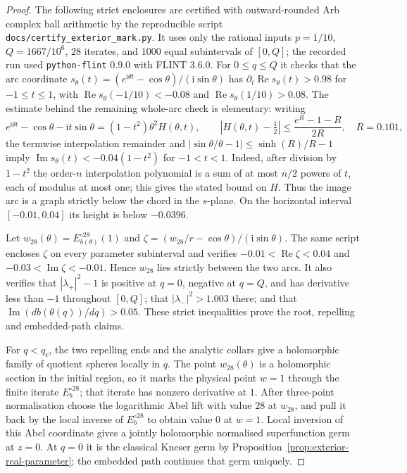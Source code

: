 \documentclass[11pt,a4paper]{article}
\theoremstyle{definition}
\newcommand{\ii}{\mathrm{i}}
\begin{document}
\begin{proof}
The following strict enclosures are certified with outward-rounded
Arb complex ball arithmetic by the reproducible script
\texttt{docs/certify\_exterior\_mark.py}.  It uses only the rational
inputs $p=1/10$, $Q=1667/10^6$, $28$ iterates, and $1000$ equal
subintervals of $[0,Q]$; the recorded run used
\texttt{python-flint} 0.9.0 with FLINT 3.6.0.  For $0\le q\le Q$ it checks that the arc
coordinate
$s_\theta(t)=(e^{\ii\theta t}-\cos\theta)/(\ii\sin\theta)$
has $\partial_t\operatorname{Re}s_\theta(t)>0.98$ for $-1\le t\le1$,
with $\operatorname{Re}s_\theta(-1/10)<-0.08$ and
$\operatorname{Re}s_\theta(1/10)>0.08$.
The estimate behind the remaining whole-arc check is elementary:
writing
\[
 e^{\ii\theta t}-\cos\theta-\ii t\sin\theta
 =(1-t^2)\theta^2H(\theta,t),
 \qquad
 |H(\theta,t)-\tfrac12|
 \le\frac{e^R-1-R}{2R},\quad R=0.101,
\]
the termwise interpolation remainder and
$|\sin\theta/\theta-1|\le\sinh(R)/R-1$ imply
$\operatorname{Im}s_\theta(t)<-0.04(1-t^2)$ for $-1<t<1$.
Indeed, after division by $1-t^2$ the order-$n$ interpolation
polynomial is a sum of at most $n/2$ powers of $t$, each of modulus
at most one; this gives the stated bound on $H$.
Thus the image arc is a graph strictly below the chord in the
$s$-plane.  On the horizontal interval $[-0.01,0.04]$ its height is
below $-0.0396$.

Let $w_{28}(\theta)=E_{b(\theta)}^{\circ28}(1)$ and
$\zeta=(w_{28}/r-\cos\theta)/(\ii\sin\theta)$.
The same script encloses $\zeta$ on every parameter subinterval and
verifies $-0.01<\operatorname{Re}\zeta<0.04$ and
$-0.03<\operatorname{Im}\zeta<-0.01$.  Hence $w_{28}$ lies strictly
between the two arcs.  It also verifies that
$|\lambda_+|^2-1$ is positive at $q=0$, negative at $q=Q$, and has
derivative less than $-1$ throughout $[0,Q]$; that
$|\lambda_-|^2>1.003$ there; and that
$\operatorname{Im}(d b(\theta(q))/dq)>0.05$.
These strict inequalities prove the root, repelling and embedded-path
claims.

For $q<q_c$, the two repelling ends and the analytic collars give a
holomorphic family of quotient spheres locally in $q$.
The point $w_{28}(\theta)$ is a holomorphic section in the initial
region, so it marks the physical point $w=1$ through the finite
iterate $E_b^{\circ28}$; that iterate has nonzero derivative at $1$.
After three-point normalisation choose the logarithmic Abel lift with
value $28$ at $w_{28}$, and pull it back by the local inverse of
$E_b^{\circ28}$ to obtain value $0$ at $w=1$.  Local inversion of
this Abel coordinate gives a jointly holomorphic normalised
superfunction germ at $z=0$.
At $q=0$ it is the classical Kneser germ by
Proposition~\ref{prop:exterior-real-parameter}; the embedded path
continues that germ uniquely.
\end{proof}
\end{document}
